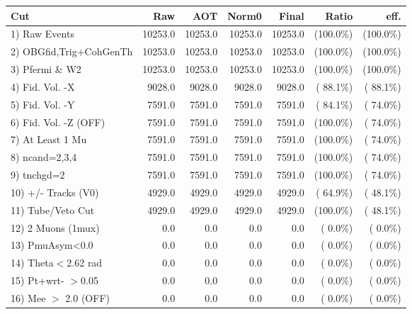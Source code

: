  \begin{table}[h!]\centering
 \begin{tabular}{||l||r|r|r|r|r|r||}
 \hline
 \hline
 Cut & Raw & AOT & Norm0 & Final & Ratio & eff.       \\
 \hline
  1) Raw Events           &      10253.0 &      10253.0 &      10253.0 &      10253.0 & (100.0\%) & (100.0\%) \\
  2) OBGfid,Trig+CohGenTh &      10253.0 &      10253.0 &      10253.0 &      10253.0 & (100.0\%) & (100.0\%) \\
  3) Pfermi \& W2         &      10253.0 &      10253.0 &      10253.0 &      10253.0 & (100.0\%) & (100.0\%) \\
  4) Fid. Vol. -X         &       9028.0 &       9028.0 &       9028.0 &       9028.0 & ( 88.1\%) & ( 88.1\%) \\
  5) Fid. Vol. -Y         &       7591.0 &       7591.0 &       7591.0 &       7591.0 & ( 84.1\%) & ( 74.0\%) \\
  6) Fid. Vol. -Z (OFF)   &       7591.0 &       7591.0 &       7591.0 &       7591.0 & (100.0\%) & ( 74.0\%) \\
  7) At Least 1 Mu        &       7591.0 &       7591.0 &       7591.0 &       7591.0 & (100.0\%) & ( 74.0\%) \\
  8) ncand=2,3,4          &       7591.0 &       7591.0 &       7591.0 &       7591.0 & (100.0\%) & ( 74.0\%) \\
  9) tnchgd=2             &       7591.0 &       7591.0 &       7591.0 &       7591.0 & (100.0\%) & ( 74.0\%) \\
 10) +/- Tracks (V0)      &       4929.0 &       4929.0 &       4929.0 &       4929.0 & ( 64.9\%) & ( 48.1\%) \\
 11) Tube/Veto Cut        &       4929.0 &       4929.0 &       4929.0 &       4929.0 & (100.0\%) & ( 48.1\%) \\
 12) 2 Muons (1mux)       &          0.0 &          0.0 &          0.0 &          0.0 & (  0.0\%) & (  0.0\%) \\
 13) PmuAsym<0.0          &          0.0 &          0.0 &          0.0 &          0.0 & (  0.0\%) & (  0.0\%) \\
 14) Theta$<$2.62 rad     &          0.0 &          0.0 &          0.0 &          0.0 & (  0.0\%) & (  0.0\%) \\
 15) Pt+wrt- $>$0.05      &          0.0 &          0.0 &          0.0 &          0.0 & (  0.0\%) & (  0.0\%) \\
 16) Mee $>$ 2.0  (OFF)   &          0.0 &          0.0 &          0.0 &          0.0 & (  0.0\%) & (  0.0\%) \\

\end{tabular}
\end{table}
